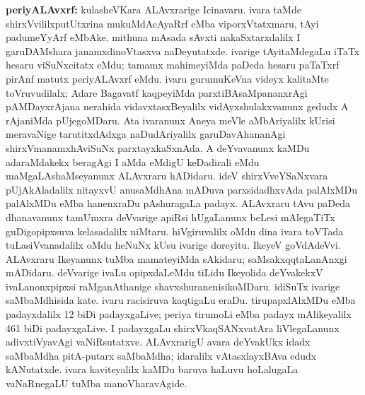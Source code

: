 {\textbf{periyALAvxrf:}} kulasheVKara ALAvxrarige Icinavaru. ivara taMde shirxVvililxputUtxrina mukuMdAcAyaRrf eMba viporxVtatxmaru, tAyi padumeYyArf eMbAke. mithuna mAsada sAvxti nakaSxtarxdalilx I garuDAMshara janamxdinoVtasxva naDeyutatxde. ivarige tAyitaMdegaLu iTaTx hesaru viSuNxcitatx eMdu; tamamx mahimeyiMda paDeda hesaru paTaTxrf pirAnf matutx periyALAvxrf eMdu. ivaru gurumuKeVna videyx kalitaMte toVruvudilalx; Adare Bagavatf kaqpeyiMda parxtiBAsaMpananxrAgi pAMDayxrAjana nerahida vidavxtasxBeyalilx vidAyxshulakxvanunx gedudx A rAjaniMda pUjegoMDaru. Ata ivaranunx Aneya meVle aMbAriyalilx kUrisi meravaNige tarutitxdAdxga naDudAriyalilx garuDavAhananAgi shirxVmanamxhAviSuNx parxtayxkaSxnAda. A deYvavanunx kaMDu adaraMdakekx beragAgi I aMda eMdigU keDadirali eMdu maMgaLAshaMseyanunx ALAvxraru hADidaru. ideV shirxVveYSaNxvara pUjAkAladalilx nitayxvU anusaMdhAna mADuva parxsidadhxvAda palAlxMDu palAlxMDu eMba hanenxraDu pAshuragaLa padayx. ALAvxraru tAvu paDeda dhanavanunx tamUmxra deVvarige apiRsi hUgaLanunx beLesi mAlegaTiTx guDigopipxsuva kelasadalilx niMtaru. hiVgiruvalilx oMdu dina ivara toVTada tuLasiVvanadalilx oMdu heNuNx kUsu ivarige doreyitu. IkeyeV goVdAdeVvi. ALAvxraru Ikeyanunx tuMba mamateyiMda sAkidaru; saMsakxqqtaLanAnxgi mADidaru. deVvarige ivaLu opipxdaLeMdu tiLidu Ikeyolida deYvakekxV ivaLanonxpipxsi raMganAthanige shavxshuranenisikoMDaru. idiSuTx ivarige saMbaMdhisida kate. ivaru racisiruva kaqtigaLu eraDu. tirupapxlAlxMDu eMba padayxdalilx {\rm 12} biDi padayxgaLive; periya tirumoLi eMba padayx mAlikeyalilx {\rm 461} biDi padayxgaLive. I padayxgaLu shirxVkaqSANxvatAra liVlegaLanunx adivxtiVyavAgi vaNiRsutatxve. ALAvxrarigU avara deYvakUkx idadx saMbaMdha pitA-putarx saMbaMdha; idaralilx vAtasxlayxBAva edudx kANutatxde. ivara kaviteyalilx kaMDu baruva haLuvu hoLalugaLa vaNaRnegaLU tuMba manoVharavAgide.

